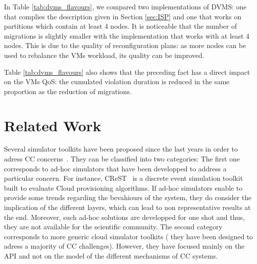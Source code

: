 In Table \ref{tab:dvms_flavours}, we compared two implementations of
DVMS: one that complies the description given in Section \ref{sec:ISP} and one
that works on partitions which contain at least 4 nodes. It is noticeable that
the number of migrations is slightly smaller with the implementation that works
with at least 4 nodes. This is due to the quality of reconfiguration plans: as
more nodes can be used to rebalance the VMs workload, its quality can be
improved.


Table \ref{tab:dvms_flavours} also shows that the preceding
fact has a direct impact on the VMs QoS: the cumulated violation duration
is reduced in the same proportion as the reduction of migrations.


\section{Related Work}
\label{sec:related}

Several simulator toolkits have been proposed since the last years in
order to adress CC concerns~\cite{CC13, DGSIM, cloudsim, icancloud,
  greencloud}.  They can be classified into two categories: The first
one corresponds to ad-hoc simulators that have been developped to
address a particular concern. For instance, CReST~\cite{CC13} is a
discrete event simulation toolkit built to evaluate Cloud provisioning
algorithms. If ad-hoc simulators enable to provide some trends
regarding the bevahiours of the system, they do consider the
implication of the different layers, which can lead to non
representative results at the end. Moreover, such ad-hoc solutions are
developped for one shot and thus, they are not available for the
scientific community. The second category \cite{icancloud, greencloud,
  cloudsim} corresponds to more generic cloud simulator toolkits (\ie
they have been designed to adress a majority of CC
challenges). However, they have focused mainly on the API and not on
the model of the different mechanisms of CC systems.

